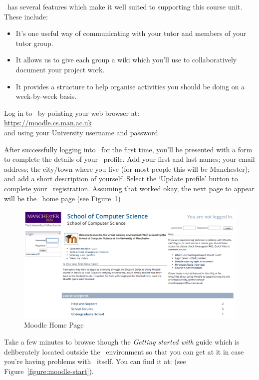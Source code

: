 \moodle\ has several features which make it well suited to supporting this course unit. These include:
\begin{itemize}
\item It's one useful way of communicating with your tutor and members of your tutor group.
\item It allows us to give each group a wiki which you'll use to collaboratively document your project work.
\item It provides a structure to help organise activities you should be doing on a week-by-week basis.
\end{itemize}

Log in to \moodle\ by pointing your web browser at:
\\

\url{https://moodle.cs.man.ac.uk}
\\

and using your University username and password. 

After successfully logging into \moodle\ for the first time, you'll be presented with a form to complete the details of your \moodle\ profile. Add your first and last names; your email address; the city/town where you live (for most people this will be Manchester); and add a short description of yourself. Select the `Update profile' button to complete your \moodle\ registration. Assuming that worked okay, the next page to appear will be the \moodle\ home page (see  Figure~\ref{figure:moodle-home})

\begin{figure}
\centerline{\includegraphics[width=15cm]{images/moodle-home}}
\caption{Moodle Home Page}\label{figure:moodle-home}
\end{figure}

Take a few minutes to browse though the \emph{Getting started with \Moodle} guide which is deliberately located outside the \moodle\ environment so that you can get at it in case you're having problems with \moodle\ itself. You can find it at:  (see Figure~\ref{figure:moodle-start}).

